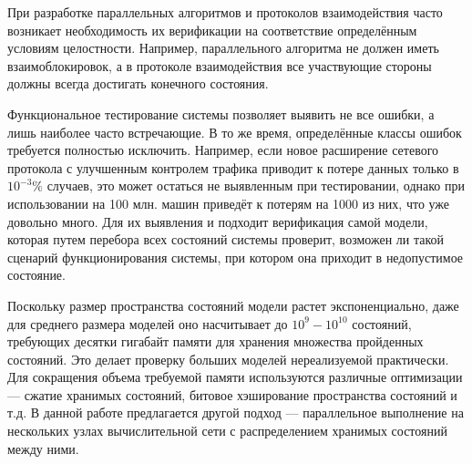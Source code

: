 \Introduction

При разработке параллельных алгоритмов и протоколов взаимодействия
часто возникает необходимость их верификации на соответствие
определённым условиям целостности. Например, параллельного алгоритма
не должен иметь взаимоблокировок, а в протоколе взаимодействия все
участвующие стороны должны всегда достигать конечного состояния.

Функциональное тестирование системы позволяет выявить не все ошибки, а
лишь наиболее часто встречающие. В то же время, определённые классы
ошибок требуется полностью исключить. Например, если новое расширение
сетевого протокола с улучшенным контролем трафика приводит к потере
данных только в $10^{-3}\%$ случаев, это может остаться не выявленным при
тестировании, однако при использовании на 100 млн. машин приведёт к
потерям на 1000 из них, что уже довольно много. Для их выявления и
подходит верификация самой модели, которая путем перебора всех
состояний системы проверит, возможен ли такой сценарий
функционирования системы, при котором она приходит в недопустимое
состояние.

Поскольку размер пространства состояний модели растет экспоненциально,
даже для среднего размера моделей оно насчитывает до $10^9 - 10^{10}$
состояний, требующих десятки гигабайт памяти для хранения множества
пройденных состояний. Это делает проверку больших моделей
нереализуемой практически. Для сокращения объема требуемой памяти
используются различные оптимизации — сжатие хранимых состояний,
битовое хэширование пространства состояний и т.д. В
данной работе предлагается другой подход — параллельное выполнение на
нескольких узлах вычислительной сети с распределением хранимых
состояний между ними.

